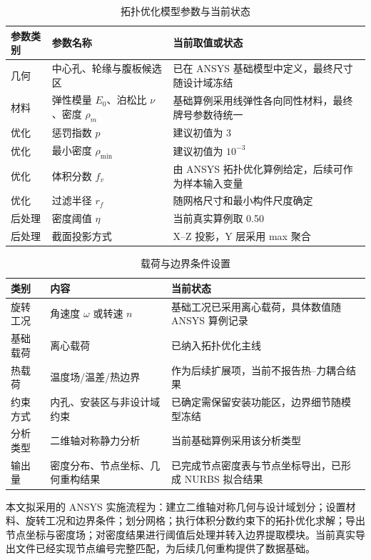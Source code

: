 \documentclass{FRB-style}
\begin{document}
\begin{table}[H]
\centering
\caption{拓扑优化模型参数与当前状态}
\begin{tabularx}{\textwidth}{p{}p{}X}
\toprule
参数类别 & 参数名称 & 当前取值或状态 \\
\midrule
几何 & 中心孔、轮缘与腹板候选区 & 已在 ANSYS 基础模型中定义，最终尺寸随设计域冻结 \\
材料 & 弹性模量 $E_0$、泊松比 $\nu$、密度 $\rho_m$ & 基础算例采用线弹性各向同性材料，最终牌号参数待统一 \\
优化 & 惩罚指数 $p$ & 建议初值为 3 \\
优化 & 最小密度 $\rho_{\min}$ & 建议初值为 $10^{-3}$ \\
优化 & 体积分数 $f_v$ & 由 ANSYS 拓扑优化算例给定，后续可作为样本输入变量 \\
优化 & 过滤半径 $r_f$ & 随网格尺寸和最小构件尺度确定 \\
后处理 & 密度阈值 $\eta$ & 当前真实算例取 0.50 \\
后处理 & 截面投影方式 & X--Z 投影，Y 层采用 max 聚合 \\
\bottomrule
\end{tabularx}
\end{table}

\begin{table}[H]
\centering
\caption{载荷与边界条件设置}
\begin{tabularx}{\textwidth}{p{}p{}X}
\toprule
类别 & 内容 & 当前状态 \\
\midrule
旋转工况 & 角速度 $\omega$ 或转速 $n$ & 基础工况已采用离心载荷，具体数值随 ANSYS 算例记录 \\
基础载荷 & 离心载荷 & 已纳入拓扑优化主线 \\
热载荷 & 温度场/温差/热边界 & 作为后续扩展项，当前不报告热--力耦合结果 \\
约束方式 & 内孔、安装区与非设计域约束 & 已确定需保留安装功能区，边界细节随模型冻结 \\
分析类型 & 二维轴对称静力分析 & 当前基础算例采用该分析类型 \\
输出量 & 密度分布、节点坐标、几何重构结果 & 已完成节点密度表与节点坐标导出，已形成 NURBS 拟合结果 \\
\bottomrule
\end{tabularx}
\end{table}

本文拟采用的 ANSYS 实施流程为：建立二维轴对称几何与设计域划分；设置材料、旋转工况和边界条件；划分网格；执行体积分数约束下的拓扑优化求解；导出节点坐标与密度场；对密度结果进行阈值后处理并转入边界提取模块。当前真实导出文件已经实现节点编号完整匹配，为后续几何重构提供了数据基础。
\end{document}
